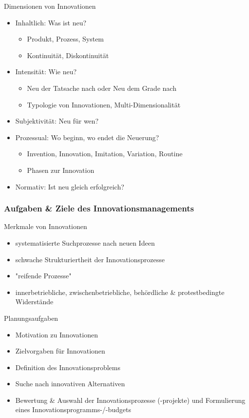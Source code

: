 \documentclass[11pt]{article}
\begin{document}
Dimensionen von Innovationen
\begin{itemize}
\item Inhaltlich: Was ist neu?
\begin{itemize}
\item Produkt, Prozess, System
\item Kontinuität, Diskontinuität
\end{itemize}
\item Intensität: Wie neu?
\begin{itemize}
\item Neu der Tatsache nach oder Neu dem Grade nach
\item Typologie von Innovationen, Multi-Dimensionalität
\end{itemize}
\item Subjektivität: Neu für wen?
\item Prozessual: Wo beginn, wo endet die Neuerung?
\begin{itemize}
\item Invention, Innovation, Imitation, Variation, Routine
\item Phasen zur Innovation
\end{itemize}
\item Normativ: Ist neu gleich erfolgreich?
\end{itemize}

\subsubsection{Aufgaben \& Ziele des Innovationsmanagements}
\label{sec:org02fa27a}
Merkmale von Innovationen
\begin{itemize}
\item systematisierte Suchprozesse nach neuen Ideen
\item schwache Strukturiertheit der  Innovationsprozesse
\item "reifende Prozesse"
\item innerbetriebliche, zwischenbetriebliche, behördliche \& protestbedingte Widerstände
\end{itemize}

Planungsaufgaben
\begin{itemize}
\item Motivation zu Innovationen
\item Zielvorgaben für Innovationen
\item Definition des Innovationsproblems
\item Suche nach innovativen Alternativen
\item Bewertung \& Auswahl der Innovationsprozesse (-projekte) und Formulierung eines Innovationsprogramms-/-budgets
\end{itemize}
\end{document}
